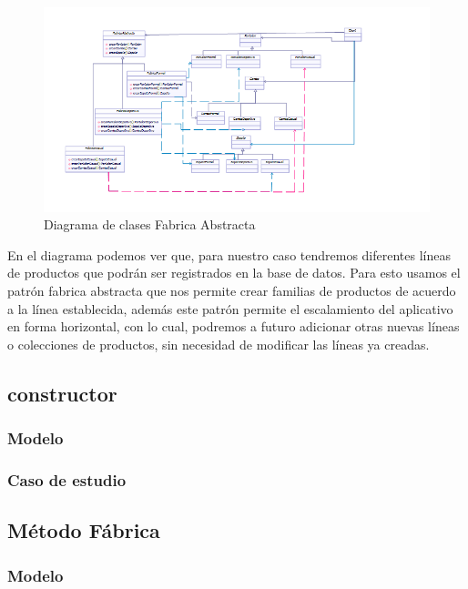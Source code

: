 	\begin{figure}[th!]
		\centering
		\includegraphics[width=1\linewidth]{arquitectura/imagenes/DiagramaFabricaAbstracta}
		\caption{Diagrama de clases Fabrica Abstracta}
	\end{figure}
	
	
	
	En el diagrama podemos ver que, para nuestro caso tendremos diferentes líneas de productos que podrán ser registrados en la base de datos. Para esto usamos el patrón fabrica abstracta que nos permite crear familias de productos de acuerdo a la línea establecida, además este patrón permite el escalamiento del aplicativo en forma horizontal, con lo cual, podremos a futuro adicionar otras nuevas líneas o colecciones de productos, sin necesidad de modificar las líneas ya creadas.
	
	
\newpage


\subsection{constructor}
\subsubsection{Modelo}
\newpage
\subsubsection{Caso de estudio}
\newpage

\subsection{Método Fábrica}
\subsubsection{Modelo}
\newpage
